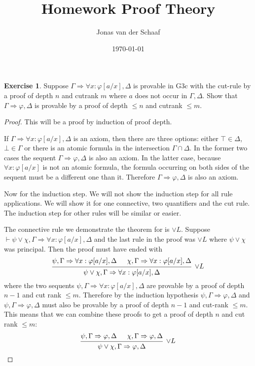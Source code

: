 \documentclass{article}
\title{Homework Proof Theory}
\author{Jonas van der Schaaf}
\date{\today}
\newcommand{\sequent}[2]{#1\Rightarrow#2}
\theoremstyle{definition}
\newtheorem{question}{Exercise}
\begin{document}
\maketitle

\begin{question}
    Suppose \(\sequent{\Gamma}{\forall x:\varphi[a/x],\Delta}\) is provable in
    G3c with the cut-rule by a proof of depth \(n\) and cutrank \(m\) where
    \(a\) does not occur in \(\Gamma,\Delta\). Show that
    \(\sequent{\Gamma}{\varphi,\Delta}\) is provable by a proof of depth \(\leq
    n\) and cutrank \(\leq m\).

    \begin{proof}
        This will be a proof by induction of proof depth.

        If \(\sequent{\Gamma}{\forall x:\varphi[a/x]},\Delta\) is an axiom, then
        there are three options: either \(\top\in\Delta\), \(\bot\in\Gamma\) or
        there is an atomic formula in the intersection \(\Gamma\cap\Delta\). In
        the former two cases the sequent \(\sequent{\Gamma}{\varphi,\Delta}\) is
        also an axiom. In the latter case, because \(\forall x:\varphi[a/x]\) is
        not an atomic formula, the formula occurring on both sides of the
        sequent must be a different one than it. Therefore
        \(\sequent{\Gamma}{\varphi,\Delta}\) is also an axiom.

        Now for the induction step. We will not show the induction step for all
        rule applications. We will show it for one connective, two quantifiers
        and the cut rule. The induction step for other rules will be similar or
        easier.

        The connective rule we demonstrate the theorem for is \(\vee L\).
        Suppose \(\vdash\sequent{\psi\vee\chi,\Gamma}{\forall
            x:\varphi[a/x],\Delta}\) and the last rule in the proof was \(\vee L\)
        where \(\psi\vee\chi\) was principal. Then the proof must have ended
        with
        \[
            \begin{prooftree}
                \hypo{\sequent{\psi,\Gamma}{\forall x:\varphi[a/x],\Delta}}
                \hypo{\sequent{\chi,\Gamma}{\forall x:\varphi[a/x],\Delta}}
                \infer2[\(\vee L\)]{\sequent{\psi\vee\chi,\Gamma}{\forall x:\varphi[a/x],\Delta}}
            \end{prooftree}
        \]
        where the two sequents \(\sequent{\psi,\Gamma}{\forall
            x:\varphi[a/x],\Delta}\) are provable by a proof of depth \(n-1\)
        and cut rank \(\leq m\). Therefore by the induction hypothesis
        \(\sequent{\psi,\Gamma}{\varphi,\Delta}\) and
        \(\sequent{\psi,\Gamma}{\varphi,\Delta}\) must also be provable by a
        proof of depth \(n-1\) and cut-rank \(\leq m\). This means that we
        can combine these proofs to get a proof of depth \(n\) and cut rank
        \(\leq m\):
        \[
            \begin{prooftree}
                \hypo{\sequent{\psi,\Gamma}{\varphi,\Delta}}
                \hypo{\sequent{\chi,\Gamma}{\varphi,\Delta}}
                \infer2[\(\vee L\)]{\sequent{\psi\vee\chi,\Gamma}{\varphi,\Delta}}
            \end{prooftree}
        \]


\end{proof}
\end{question}
\end{document}
